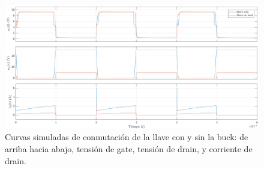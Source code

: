 \documentclass[e4_tp1_main.tex]{subfiles}
\begin{document}
\begin{landscape}
	\vspace*{\fill}
	\begin{figure}[ht]
		\centering
		\includegraphics[scale=0.67]{images/ej3/conmutacion3.png}
		\caption{Curvas simuladas de conmutaci\'on de la llave con y sin la buck: de arriba hacia abajo, tensi\'on de gate, tensi\'on de drain, y corriente de drain.}
		\label{fig:curvas3}
	\end{figure}
	\vspace*{\fill}
\end{landscape}
\end{document}
